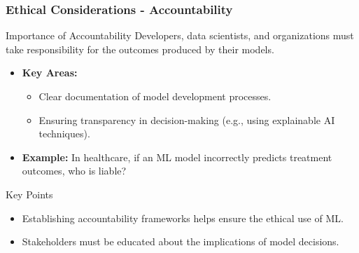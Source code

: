 \documentclass[aspectratio=169]{beamer}
\begin{document}
\begin{frame}[fragile]
    \frametitle{Ethical Considerations - Accountability}
    \begin{block}{Importance of Accountability}
        Developers, data scientists, and organizations must take responsibility for the outcomes produced by their models.
    \end{block}
    
    \begin{itemize}
        \item \textbf{Key Areas:}
        \begin{itemize}
            \item Clear documentation of model development processes.
            \item Ensuring transparency in decision-making (e.g., using explainable AI techniques).
        \end{itemize}
        
        \item \textbf{Example:} In healthcare, if an ML model incorrectly predicts treatment outcomes, who is liable?
    \end{itemize}

    \begin{block}{Key Points}
        \begin{itemize}
            \item Establishing accountability frameworks helps ensure the ethical use of ML.
            \item Stakeholders must be educated about the implications of model decisions.
        \end{itemize}
    \end{block}
\end{frame}
\end{document}
